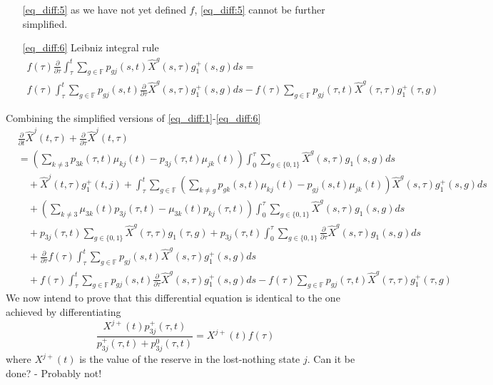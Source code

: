 \documentclass[12pt]{article}
\begin{document}
\begin{itemize}
\item[\eqref{eq_diff:5}] as we have not yet defined $f$, \eqref{eq_diff:5} cannot be further simplified.
\item[\eqref{eq_diff:6}] Leibniz integral rule
\begin{gather*}
f(\tau)  \frac{\partial}{\partial \tau} \int_{\tau}^t \sum_{g \in \mathbb{F}} 
p_{gj}(s,t) \hat{X}^g(s,\tau) g_1^+(s,g) ds =
\\
f(\tau)  \int_{\tau}^t \sum_{g \in \mathbb{F}} 
p_{gj}(s,t)  \frac{\partial}{\partial \tau} \hat{X}^g(s,\tau) g_1^+(s,g) ds
-
f(\tau) \sum_{g \in \mathbb{F}} 
p_{gj}(\tau,t)   \hat{X}^g(\tau,\tau) g_1^+(\tau,g) 
\end{gather*}
\end{itemize}
Combining the simplified versions of \eqref{eq_diff:1}-\eqref{eq_diff:6}
\begin{align*}
&\frac{\partial}{\partial t}\hat{X}^j(t,\tau)+ \frac{\partial}{\partial \tau}\hat{X}^j(t,\tau)
\\
&=
\left( \sum_{k\neq 3} p_{3k}(\tau,t)\mu_{kj}(t)- p_{3j}(\tau,t)\mu_{jk}(t) \right)
\int_0^{\tau} \sum_{g \in \{0 , 1\}} \hat{X}^g(s,\tau) g_1(s,g) ds
\\
& \quad +
\hat{X}^j(t,\tau) g_1^+(t,j)  
+
\int_{\tau}^t \sum_{g \in \mathbb{F}} 
\left(\sum_{k\neq g} p_{gk}(s,t)\mu_{kj}(t)- p_{gj}(s,t)\mu_{jk}(t)\right) \hat{X}^g(s,\tau) g_1^+(s,g) ds
\\
&\quad +
\left( \sum_{k\neq 3} \mu_{3k}(t)p_{3j}(\tau,t) - \mu_{3k}(t) p_{kj}(\tau,t) \right)
\int_0^{\tau}  \sum_{g \in \{0 , 1\}}   \hat{X}^g(s,\tau) g_1(s,g) ds
\\
&\quad +
p_{3j}(\tau,t)  \sum_{g \in \{0 , 1\}}   \hat{X}^g(\tau,\tau) g_1(\tau,g) 
+
p_{3j}(\tau,t)    \int_0^{\tau} \sum_{g \in \{0 , 1\}} \frac{\partial}{\partial \tau} \hat{X}^g(s,\tau) g_1(s,g) ds
\\
&\quad +
\frac{\partial}{\partial \tau}   f(\tau)  \int_{\tau}^t \sum_{g \in \mathbb{F}} 
p_{gj}(s,t) \hat{X}^g(s,\tau) g_1^+(s,g) ds
\\
&\quad +
f(\tau)  \int_{\tau}^t \sum_{g \in \mathbb{F}} 
p_{gj}(s,t)  \frac{\partial}{\partial \tau} \hat{X}^g(s,\tau) g_1^+(s,g) ds
-
f(\tau) \sum_{g \in \mathbb{F}} 
p_{gj}(\tau,t)   \hat{X}^g(\tau,\tau) g_1^+(\tau,g) 
\end{align*}
We now intend to prove that this differential equation is identical to the one achieved by differentiating
$$
\frac{X^{j+}(t)p_{3j}^+(\tau,t)}{p_{3j}^+(\tau,t)+p_{3j}^0(\tau,t)}=X^{j+}(t)f(\tau)
$$
where $X^{j+}(t)$ is the value of the reserve in the lost-nothing state $j$. Can it be done? - Probably not!
\newpage
\end{document}
